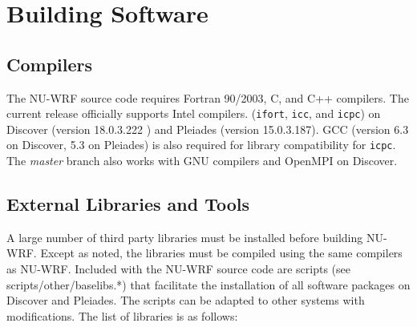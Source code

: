 \section{Building Software}
\label{sec:Building}

\subsection{Compilers}

The NU-WRF source code requires Fortran 90/2003, C, and C++ compilers. 
The current release officially supports Intel compilers.
(\texttt{ifort}, \texttt{icc}, and \texttt{icpc}) on Discover (version 18.0.3.222 ) and Pleiades (version 15.0.3.187). GCC (version 6.3 on Discover, 5.3 on Pleiades) is also required for library compatibility for \texttt{icpc}. The \emph{master} branch also works with GNU compilers and OpenMPI on Discover. 

\subsection{External Libraries and Tools}
\label{subsec:Libraries}

A large number of third party libraries must be installed before building 
NU-WRF. Except as noted, the libraries must be compiled using the same 
compilers as NU-WRF.  Included with  the NU-WRF source code are scripts (see scripts/other/baselibs.*) that facilitate the installation of all software packages on Discover and Pleiades. The scripts can be adapted to other systems with modifications. The list of libraries is as follows:

